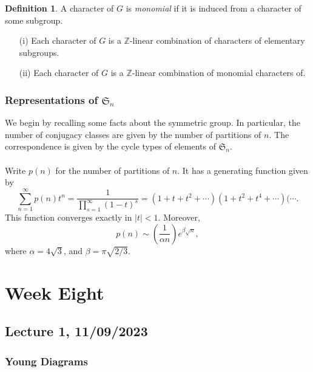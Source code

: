 \documentclass[a4paper]{report}
\theoremstyle{definition}
\newtheorem{definition}{Definition}
\theoremstyle{remark}
\theoremstyle{proposition}
\theoremstyle{conjecture}
\theoremstyle{lemma}
\theoremstyle{corollary}
\theoremstyle{exercise}
\theoremstyle{example}
\begin{document}
\begin{definition}
    A character of $G$ is \emph{monomial} if it is induced 
    from a character of some subgroup.
\end{definition}

\begin{theorem}
    \leavevmode
    \begin{itemize}
        \item[(i)] Each character of $G$ is a $\mathbb{Z}$-linear combination 
            of characters of elementary subgroups.
        \item[(ii)] Each character of $G$ is a $\mathbb{Z}$-linear 
            combination of monomial characters of.
    \end{itemize}
\end{theorem}

\subsection{Representations of $\mathfrak{S}_n$}

We begin by recalling some facts about the symmetric group. In particular,
the number of conjugacy classes are given by the number of partitions of 
$n$. The correspondence is given by the cycle types of elements of 
$\mathfrak{S}_n$.\\\\
Write $p(n)$ for the number of partitions of $n$. It has a generating function
given by $$\sum_{n=1}^\infty p(n)t^n = \frac{1}{\prod_{s=1}^\infty (1-t)^s}=(1+t+t^2+\cdots)(1+t^2+t^4+\cdots)(\cdots.$$
This function converges exactly in $\vert t\vert < 1$.
Moreover, $$p(n) \sim \left(\frac{1}{\alpha n}\right)e^{\beta \sqrt{n}},$$
where $\alpha = 4\sqrt{3}$, and $\beta = \pi \sqrt{2/3}$.

\chapter{Week Eight}

\section{Lecture 1, 11/09/2023}

\subsection{Young Diagrams}
\end{document}

